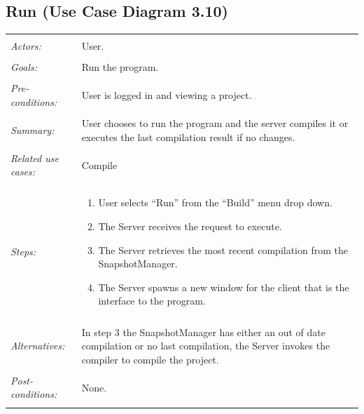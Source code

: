 \documentclass[11pt]{report}
\begin{document}
\subsection{Run (Use Case Diagram 3.10)}
\begin{tabular}{ p{2cm} p{12cm} }
     \hline
     \\
     \textit{Actors:} & User. \\ 
     \\
     \textit{Goals:} & Run the program. \\
     \\
     \textit{Pre-conditions:} & User is logged in and viewing a project. \\
     \\
     \textit{Summary:} & User chooses to run the program and the server compiles it or executes the last compilation result if no changes. \\
     \\
     \textit{Related use cases:} & Compile \\ 
     \\
     \textit{Steps:} & \begin{enumerate}
        \item User selects ``Run'' from the ``Build'' menu drop down.
        \item The Server receives the request to execute.
        \item The Server retrieves the most recent compilation from the SnapshotManager.
        \item The Server spawns a new window for the client that is the interface to the program.
     \end{enumerate} \\
     \\
     \textit{Alternatives:} & In step 3 the SnapshotManager has either an out of date compilation or no last compilation, the Server invokes the compiler to compile the project. \\
     \\
     \textit{Post-conditions:} & None. \\
     \\
    \hline
\end{tabular}
\end{document}
